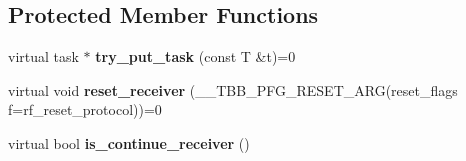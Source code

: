 \subsection*{Protected Member Functions}
\begin{DoxyCompactItemize}
\item 
\hypertarget{classtbb_1_1flow_1_1interface7_1_1receiver_a3581a59d59476fffdc7caeea06c26371}{}virtual task $\ast$ {\bfseries try\+\_\+put\+\_\+task} (const T \&t)=0\label{classtbb_1_1flow_1_1interface7_1_1receiver_a3581a59d59476fffdc7caeea06c26371}

\item 
\hypertarget{classtbb_1_1flow_1_1interface7_1_1receiver_ac902b1e09eea9748223eb50dc38d3575}{}virtual void {\bfseries reset\+\_\+receiver} (\+\_\+\+\_\+\+T\+B\+B\+\_\+\+P\+F\+G\+\_\+\+R\+E\+S\+E\+T\+\_\+\+A\+R\+G(reset\+\_\+flags f=rf\+\_\+reset\+\_\+protocol))=0\label{classtbb_1_1flow_1_1interface7_1_1receiver_ac902b1e09eea9748223eb50dc38d3575}

\item 
\hypertarget{classtbb_1_1flow_1_1interface7_1_1receiver_ae91eab3e06d4139ac38f143c74fe9eab}{}virtual bool {\bfseries is\+\_\+continue\+\_\+receiver} ()\label{classtbb_1_1flow_1_1interface7_1_1receiver_ae91eab3e06d4139ac38f143c74fe9eab}

\end{DoxyCompactItemize}
